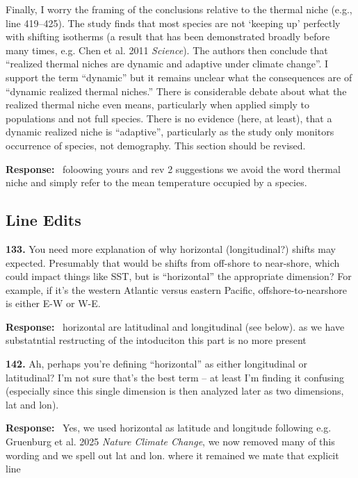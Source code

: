 \documentclass[11pt]{article}
\newcommand{\reviewer}[1]{\par\medskip\noindent\textcolor{revcolor}{#1}\par}
\newenvironment{reply}
{\par\smallskip\begingroup\color{replycolor}\noindent\textbf{Response:}\ }
{\endgroup\par\medskip}
\begin{document}
\reviewer{Finally, I worry the framing of the conclusions relative to the thermal
niche (e.g., line 419--425). The study finds that most species are not `keeping up'
perfectly with shifting isotherms (a result that has been demonstrated broadly
before many times, e.g. Chen et al. 2011 \textit{Science}). The authors then
conclude that ``realized thermal niches are dynamic and adaptive under climate
change''. I support the term ``dynamic'' but it remains unclear what the
consequences are of ``dynamic realized thermal niches.'' There is considerable
debate about what the realized thermal niche even means, particularly when applied
simply to populations and not full species. There is no evidence (here, at least),
that a dynamic realized niche is ``adaptive'', particularly as the study only
monitors occurrence of species, not demography. This section should be revised.}

\begin{reply}
foloowing yours and rev 2 suggestions we avoid the word thermal niche and simply refer to the mean temperature occupied by a species.
\end{reply}

\subsection*{Line Edits}

\reviewer{\textbf{133.} You need more explanation of why horizontal (longitudinal?)
shifts may expected. Presumably that would be shifts from off-shore to near-shore,
which could impact things like SST, but is ``horizontal'' the appropriate
dimension? For example, if it's the western Atlantic versus eastern Pacific,
offshore-to-nearshore is either E-W or W-E.}

\begin{reply}
horizontal are latitudinal and longitudinal (see below). as we have substatntial restructing of the intoduciton this part is no more present
\end{reply}

\reviewer{\textbf{142.} Ah, perhaps you're defining ``horizontal'' as either
longitudinal or latitudinal? I'm not sure that's the best term -- at least I'm
finding it confusing (especially since this single dimension is then analyzed later
as two dimensions, lat and lon).}

\begin{reply}
Yes, we used horizontal as latitude and longitude following e.g. Gruenburg et al. 2025
\textit{Nature Climate Change}, we now removed many of this wording and we spell out lat and lon. where it remained we mate that explicit line
\end{reply}
\end{document}
